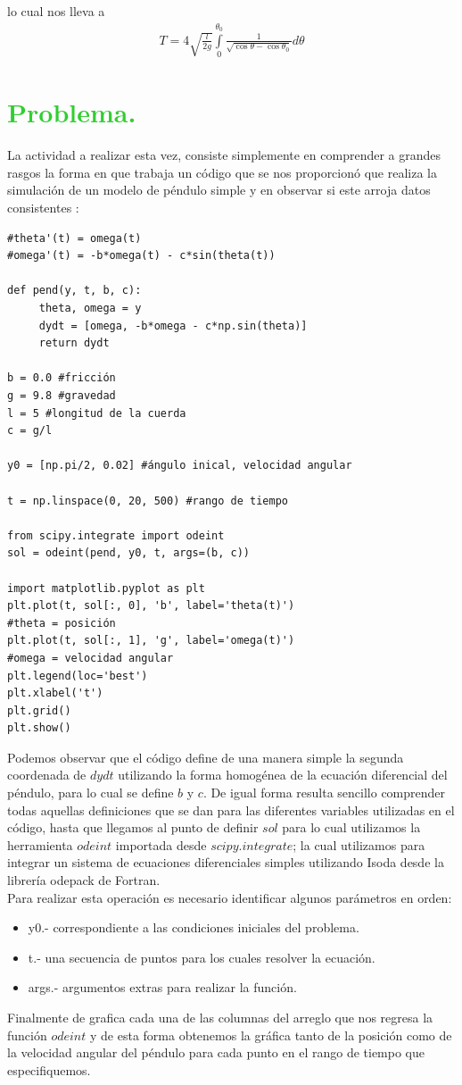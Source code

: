 \documentclass[12pt]{article}
\begin{document}
lo cual nos lleva a
\begin{eqnarray*}
T=4 \sqrt{\frac{l}{2g}}\int\limits_0^{\theta_0} \frac{1}{\sqrt{\cos\theta - \cos\theta_0}} d\theta
\end{eqnarray*}


\pagebreak
\section*{\textcolor{LimeGreen}{Problema.}}
La actividad a realizar esta vez, consiste simplemente en comprender a grandes rasgos la forma en que trabaja un código que se nos proporcionó que realiza la simulación de un modelo de péndulo simple y en observar si este arroja datos consistentes :

\begin{verbatim}
#theta'(t) = omega(t)
#omega'(t) = -b*omega(t) - c*sin(theta(t))

def pend(y, t, b, c):
     theta, omega = y
     dydt = [omega, -b*omega - c*np.sin(theta)]
     return dydt

b = 0.0 #fricción
g = 9.8 #gravedad
l = 5 #longitud de la cuerda
c = g/l

y0 = [np.pi/2, 0.02] #ángulo inical, velocidad angular

t = np.linspace(0, 20, 500) #rango de tiempo

from scipy.integrate import odeint
sol = odeint(pend, y0, t, args=(b, c))

import matplotlib.pyplot as plt
plt.plot(t, sol[:, 0], 'b', label='theta(t)') 
#theta = posición
plt.plot(t, sol[:, 1], 'g', label='omega(t)') 
#omega = velocidad angular
plt.legend(loc='best')
plt.xlabel('t')
plt.grid()
plt.show()
\end{verbatim}

Podemos observar que el código define de una manera simple la segunda coordenada de $dydt$ utilizando la forma homogénea de la ecuación diferencial del péndulo, para lo cual se define $b$ y $c$. De igual forma resulta sencillo comprender todas aquellas definiciones que se dan para las diferentes variables utilizadas en el código, hasta que llegamos al punto de definir $sol$ para lo cual utilizamos la herramienta $odeint$ importada desde $scipy.integrate$; la cual utilizamos para integrar un sistema de ecuaciones diferenciales simples utilizando Isoda desde la librería odepack de Fortran.\\
Para realizar esta operación es necesario identificar algunos parámetros en orden:
\begin{itemize}
\item y0.- correspondiente a las condiciones iniciales del problema.
\item t.- una secuencia de puntos para los cuales resolver la ecuación.
\item args.- argumentos extras para realizar la función.
\end{itemize}
Finalmente de grafica cada una de las columnas del arreglo que nos regresa la función $odeint$ y de esta forma obtenemos la gráfica tanto de la posición como de la velocidad angular del péndulo para cada punto en el rango de tiempo que especifiquemos.
\end{document}
